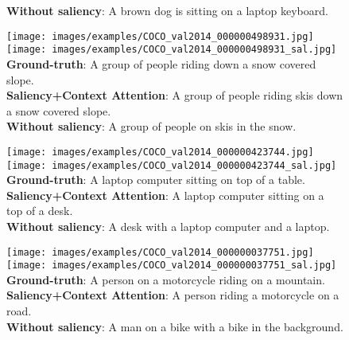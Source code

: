 \begin{figure}[t]
\begin{center}
\begin{minipage}[t]{0.32\linewidth}
{        \textbf{Without saliency}: A brown dog is sitting on a laptop keyboard. \\
    }
    \end{minipage}
    \hspace{0.02cm}
    \begin{minipage}[t]{0.32\linewidth}
    \texttt{[image: images/examples/COCO\_val2014\_000000498931.jpg]} 
    \texttt{[image: images/examples/COCO\_val2014\_000000498931\_sal.jpg]}  
    \scriptsize{
        \textbf{Ground-truth}: A group of people riding down a snow covered slope. \\
        \textbf{Saliency+Context Attention}: A group of people riding skis down a snow covered slope. \\
        \textbf{Without saliency}: A group of people on skis in the snow. \\
    }
    \end{minipage}
    \hspace{0.02cm}
    \begin{minipage}[t]{0.32\linewidth}
    \texttt{[image: images/examples/COCO\_val2014\_000000423744.jpg]} 
    \texttt{[image: images/examples/COCO\_val2014\_000000423744\_sal.jpg]}  
    \scriptsize{
        \textbf{Ground-truth}: A laptop computer sitting on top of a table. \\
        \textbf{Saliency+Context Attention}: A laptop computer sitting on a top of a desk. \\
        \textbf{Without saliency}: A desk with a laptop computer and a laptop. \\
    }
    \end{minipage}
    \begin{minipage}[t]{0.32\linewidth}
    \texttt{[image: images/examples/COCO\_val2014\_000000037751.jpg]} 
    \texttt{[image: images/examples/COCO\_val2014\_000000037751\_sal.jpg]}  
    \scriptsize{
        \textbf{Ground-truth}: A person on a motorcycle riding on a mountain. \\
        \textbf{Saliency+Context Attention}: A person riding a motorcycle on a road. \\
        \textbf{Without saliency}: A man on a bike with a bike in the background. \\
    }
    \end{minipage}
    \hspace{0.02cm}
    \begin{minipage}[t]{0.32\linewidth}

\end{minipage}
\end{center}
\end{figure}
